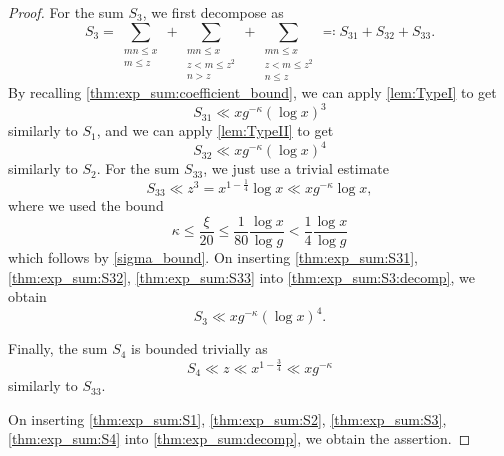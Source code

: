 \documentclass[hidelinks]{amsart}
\numberwithin{equation}{section}
\theoremstyle{plain}
\theoremstyle{definition}
\begin{document}
\begin{proof}
For the sum $S_{3}$, we first decompose as
\begin{equation}
\label{thm:exp_sum:S3:decomp}
S_{3}
=
\sum_{\substack{
mn\le x\\
m\le z
}}
+
\sum_{\substack{
mn\le x\\
z<m\le z^{2}\\
n>z
}}
+
\sum_{\substack{
mn\le x\\
z<m\le z^{2}\\
n\le z
}}
\eqqcolon
S_{31}
+
S_{32}
+
S_{33}.
\end{equation}
By recalling \cref{thm:exp_sum:coefficient_bound},
we can apply \cref{lem:TypeI} to get
\begin{equation}
\label{thm:exp_sum:S31}
S_{31}
\ll
xg^{-\kappa}(\log x)^{3}
\end{equation}
similarly to $S_{1}$, and we can apply \cref{lem:TypeII} to get
\begin{equation}
\label{thm:exp_sum:S32}
S_{32}
\ll
xg^{-\kappa}(\log x)^{4}
\end{equation}
similarly to $S_{2}$. For the sum $S_{33}$, we just use a trivial estimate
\begin{equation}
\label{thm:exp_sum:S33}
S_{33}
\ll
z^{3}
=
x^{1-\frac{1}{4}}\log x
\ll
xg^{-\kappa}\log x,
\end{equation}
where we used the bound
\[
\kappa
\le
\frac{\xi}{20}
\le
\frac{1}{80}\frac{\log x}{\log g}
<
\frac{1}{4}\frac{\log x}{\log g}
\]
which follows by \cref{sigma_bound}.
On inserting \cref{thm:exp_sum:S31}, \cref{thm:exp_sum:S32}, \cref{thm:exp_sum:S33}
into \cref{thm:exp_sum:S3:decomp}, we obtain
\begin{equation}
\label{thm:exp_sum:S3}
S_{3}
\ll
xg^{-\kappa}(\log x)^{4}.
\end{equation}

Finally, the sum $S_{4}$ is bounded trivially as
\begin{equation}
\label{thm:exp_sum:S4}
S_{4}
\ll
z
\ll
x^{1-\frac{3}{4}}
\ll
xg^{-\kappa}
\end{equation}
similarly to $S_{33}$.

On inserting
\cref{thm:exp_sum:S1},
\cref{thm:exp_sum:S2},
\cref{thm:exp_sum:S3},
\cref{thm:exp_sum:S4}
into \cref{thm:exp_sum:decomp},  we obtain the assertion.
\end{proof}

\end{document}
